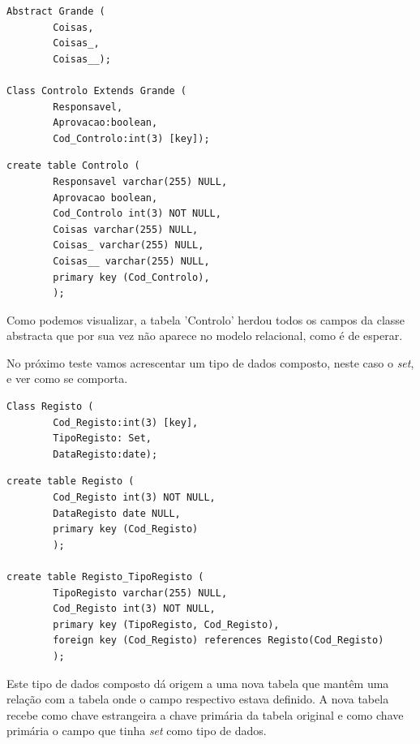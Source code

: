 \documentclass[a4paper]{article}
\begin{document}
\begin{small}
\begin{lstlisting}
Abstract Grande (
        Coisas,
        Coisas_,
        Coisas__);

Class Controlo Extends Grande (
        Responsavel,
        Aprovacao:boolean,
        Cod_Controlo:int(3) [key]);
\end{lstlisting}
\end{small}

\begin{small}
\begin{lstlisting}
create table Controlo (
        Responsavel varchar(255) NULL,
        Aprovacao boolean,
        Cod_Controlo int(3) NOT NULL,
        Coisas varchar(255) NULL,
        Coisas_ varchar(255) NULL,
        Coisas__ varchar(255) NULL,
        primary key (Cod_Controlo),
        );
\end{lstlisting}
\end{small}

\bigskip
\hspace{1cm}Como podemos visualizar, a tabela 'Controlo' herdou todos os campos da classe abstracta que por sua vez não aparece no modelo relacional, como é de esperar.

\hspace{1cm}No próximo teste vamos acrescentar um tipo de dados composto, neste caso o {\em set}, e ver como se comporta.\\

\begin{small}
\begin{lstlisting}
Class Registo (
        Cod_Registo:int(3) [key],
        TipoRegisto: Set,
        DataRegisto:date);
\end{lstlisting}
\end{small}

\begin{small}
\begin{lstlisting}
create table Registo (
        Cod_Registo int(3) NOT NULL,
        DataRegisto date NULL,
        primary key (Cod_Registo)
        );

create table Registo_TipoRegisto (
        TipoRegisto varchar(255) NULL,
        Cod_Registo int(3) NOT NULL,
        primary key (TipoRegisto, Cod_Registo),
        foreign key (Cod_Registo) references Registo(Cod_Registo)
        );
\end{lstlisting}
\end{small}

\bigskip
\hspace{1cm}Este tipo de dados composto dá origem a uma nova tabela que mantêm uma relação com a tabela onde o campo respectivo estava definido. A nova tabela recebe como chave estrangeira a chave primária da tabela original e como chave primária o campo que tinha {\em set} como tipo de dados.
\end{document}
